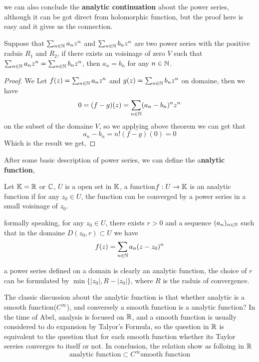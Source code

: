 \documentclass[en,geye,blue,pc,12pt]{elegantnote}
\begin{document}
we can also conclude the \textbf{analytic continuation} about the power series, although it can be got direct from holomorphic function, but the proof here is easy and it gives us the connection.
\begin{corollary}
    Suppose that \(\sum_{n \in \mathbb{N}}a_nz^n\) and  \(\sum_{n \in \mathbb{N}}b_nz^n\) are two power series with the positive raduis \(R_1\) and \(R_2\), if there exists an voisinage of zero \(V\) such that \(\sum_{n \in \mathbb{N}}a_nz^n = \sum_{n \in \mathbb{N}}b_nz^n\), then \(a_n = b_n\) for any \(n \in \mathbb{N}\). 

    \begin{proof}
        We Let \(f(z) = \sum_{n \in \mathbb{N}}a_nz^n\) and \(g(z) = \sum_{n \in \mathbb{N}}b_nz^n\) on domaine, then we have 
        \[0 = (f-g)(z) = \sum_{n \in \mathbb{N}} (a_n-b_n)^nz^n\]
        on the subset of the domaine \(V\), so we applying above theorem we can get that \[a_n-b_n = n!(f-g)(0) = 0\] Which is the result we get,
    \end{proof}
\end{corollary}

After some basic description of power series, we can define the a\textbf{nalytic function}, 
\begin{definition}
    Let \(\mathbb{K} = \mathbb{R}\) or \(\mathbb{C}\), \(U\) is a open set in \(\mathbb{K}\), a function\(f: U \to \mathbb{K}\) is an analytic function if for any \(z_0 \in U\), the function can be converged by a power series in a small voisinage of \(z_0\).

    formally speaking, for any \(z_0 \in U\), there exists \(r > 0\) and a sequence \((a_n)_{n \in \mathbb{N}}\) such that in the domaine \(D(z_0,r) \subset U\) we have
    \[f(z) = \sum_{n \in \mathbb{N}} a_n(z-z_0)^n\]
\end{definition}

\begin{remark}
    a power series defined on a domain is clearly an analytic function, the choice of \(r\) can be formulated by \(\min\{|z_0|,R-|z_0|\}\), where \(R\) is the raduis of convergence.
\end{remark}

The classic discussion about the analytic function is that whether  analytic is a smooth function(\(C^{\infty}\)), and conversely a smooth function is a analytic function? In the time of Abel, analysis is focused on \(\mathbb{R}\), and a smooth function is usually considered to do expansion by Talyor's Formula, so the question in \(\mathbb{R}\) is equivalent to the question that for each smooth function whether its Taylor sereies converges to itself or not. In conclusion, the relation show as folloing in \(\mathbb{R}\)
\[ \text{analytic function} \subset C^{\infty} \text{smooth function}\]
\end{document}
